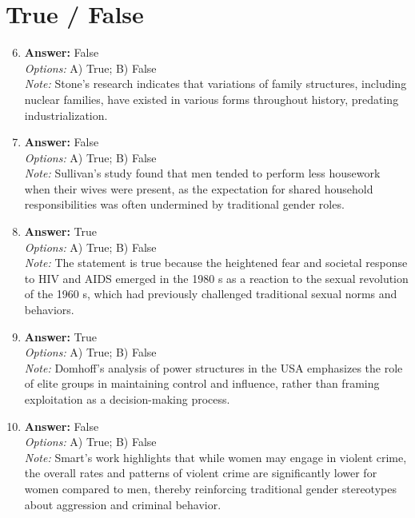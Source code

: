 \documentclass[12pt]{article}
\begin{document}
\section*{True / False}
\begin{enumerate}[label=\arabic*.]
\setcounter{enumi}{5}
\item \textbf{Answer:} False
\\ \textit{Options:} A) True; B) False
\\ \textit{Note:} Stone's research indicates that variations of family structures, including nuclear families, have existed in various forms throughout history, predating industrialization.
\item \textbf{Answer:} False
\\ \textit{Options:} A) True; B) False
\\ \textit{Note:} Sullivan's study found that men tended to perform less housework when their wives were present, as the expectation for shared household responsibilities was often undermined by traditional gender roles.
\item \textbf{Answer:} True
\\ \textit{Options:} A) True; B) False
\\ \textit{Note:} The statement is true because the heightened fear and societal response to HIV and AIDS emerged in the 1980 s as a reaction to the sexual revolution of the 1960 s, which had previously challenged traditional sexual norms and behaviors.
\item \textbf{Answer:} True
\\ \textit{Options:} A) True; B) False
\\ \textit{Note:} Domhoff's analysis of power structures in the USA emphasizes the role of elite groups in maintaining control and influence, rather than framing exploitation as a decision-making process.
\item \textbf{Answer:} False
\\ \textit{Options:} A) True; B) False
\\ \textit{Note:} Smart's work highlights that while women may engage in violent crime, the overall rates and patterns of violent crime are significantly lower for women compared to men, thereby reinforcing traditional gender stereotypes about aggression and criminal behavior.
\end{enumerate}
\end{document}
